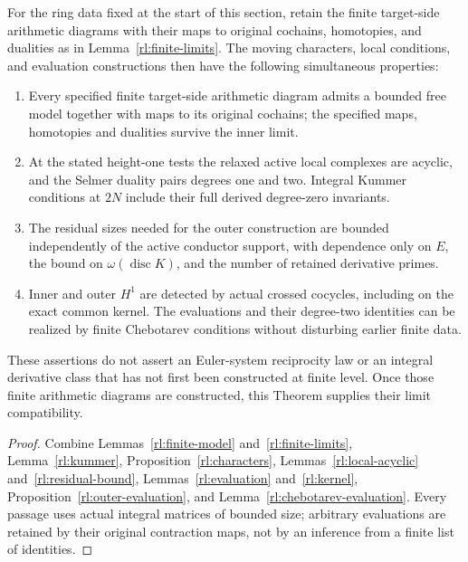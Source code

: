 \begin{theorem}
\label{rl:limit-evaluation-package}
For the ring data fixed at the start of this section, retain the finite
target-side arithmetic diagrams with their maps to original cochains, homotopies,
and dualities as in Lemma~\ref{rl:finite-limits}.  The moving characters,
local conditions, and evaluation constructions then have the following
simultaneous properties:
\begin{enumerate}
\item Every specified finite target-side arithmetic diagram admits a bounded free
model together with maps to its original cochains; the specified
maps, homotopies and dualities survive the inner limit.
\item At the stated height-one tests the relaxed active local
complexes are acyclic, and the Selmer duality pairs degrees one
and two.  Integral Kummer conditions at $2N$ include their full
derived degree-zero invariants.
\item The residual sizes needed for the outer construction are
bounded independently of the active conductor support, with
dependence only on $E$, the bound on $\omega(\operatorname{disc}K)$,
and the number of retained derivative primes.
\item Inner and outer $H^1$ are detected by actual crossed
cocycles, including on the exact common kernel.  The evaluations
and their degree-two identities can be realized by finite
Chebotarev conditions without disturbing earlier finite data.
\end{enumerate}
These assertions do not assert an Euler-system reciprocity law or
an integral derivative class that has not first been constructed
at finite level.  Once those finite arithmetic diagrams are
constructed, this Theorem supplies their limit compatibility.
\end{theorem}

\begin{proof}
Combine Lemmas~\ref{rl:finite-model} and~\ref{rl:finite-limits},
Lemma~\ref{rl:kummer}, Proposition~\ref{rl:characters},
Lemmas~\ref{rl:local-acyclic} and~\ref{rl:residual-bound},
Lemmas~\ref{rl:evaluation} and~\ref{rl:kernel},
Proposition~\ref{rl:outer-evaluation}, and
Lemma~\ref{rl:chebotarev-evaluation}.  Every passage uses actual
integral matrices of bounded size; arbitrary evaluations are
retained by their original contraction maps, not by an inference
from a finite list of identities.
\end{proof}
